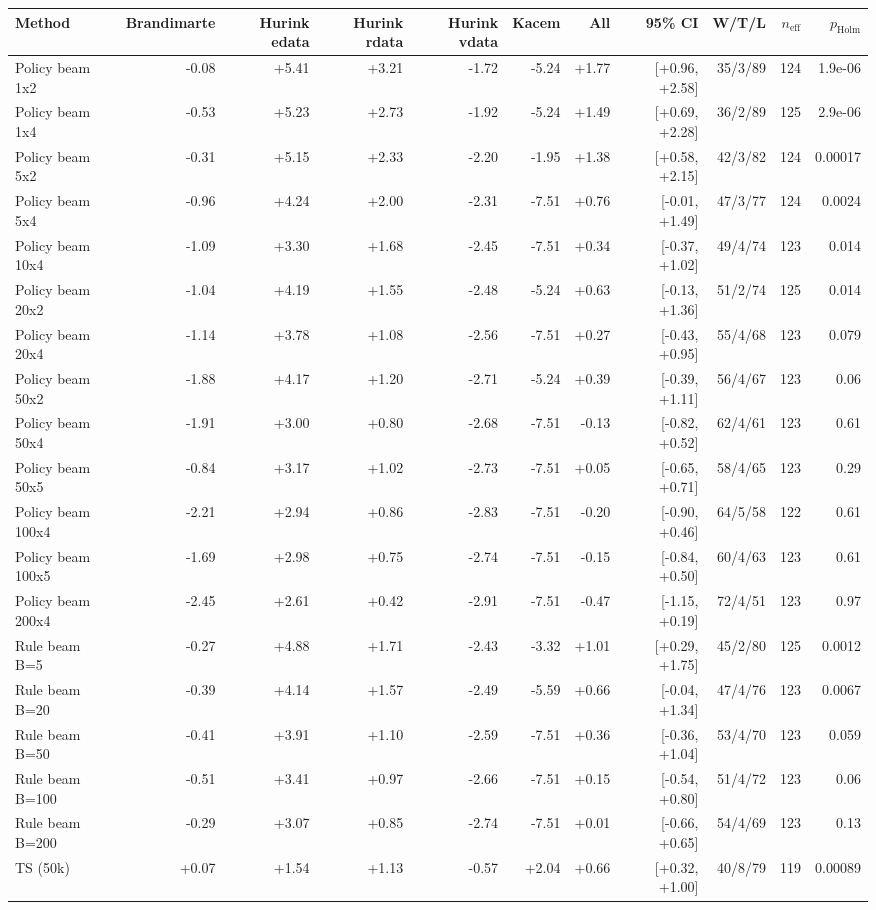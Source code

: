 \begin{tabular}{lrrrrrrrrrr}
\toprule
Method & Brandimarte & Hurink edata & Hurink rdata & Hurink vdata & Kacem & All & 95\% CI & W/T/L & $n_{\mathrm{eff}}$ & $p_{\mathrm{Holm}}$ \\
\midrule
Policy beam 1x2 & -0.08 & +5.41 & +3.21 & -1.72 & -5.24 & +1.77 & [+0.96, +2.58] & 35/3/89 & 124 & 1.9e-06 \\
Policy beam 1x4 & -0.53 & +5.23 & +2.73 & -1.92 & -5.24 & +1.49 & [+0.69, +2.28] & 36/2/89 & 125 & 2.9e-06 \\
Policy beam 5x2 & -0.31 & +5.15 & +2.33 & -2.20 & -1.95 & +1.38 & [+0.58, +2.15] & 42/3/82 & 124 & 0.00017 \\
Policy beam 5x4 & -0.96 & +4.24 & +2.00 & -2.31 & -7.51 & +0.76 & [-0.01, +1.49] & 47/3/77 & 124 & 0.0024 \\
Policy beam 10x4 & -1.09 & +3.30 & +1.68 & -2.45 & -7.51 & +0.34 & [-0.37, +1.02] & 49/4/74 & 123 & 0.014 \\
Policy beam 20x2 & -1.04 & +4.19 & +1.55 & -2.48 & -5.24 & +0.63 & [-0.13, +1.36] & 51/2/74 & 125 & 0.014 \\
Policy beam 20x4 & -1.14 & +3.78 & +1.08 & -2.56 & -7.51 & +0.27 & [-0.43, +0.95] & 55/4/68 & 123 & 0.079 \\
Policy beam 50x2 & -1.88 & +4.17 & +1.20 & -2.71 & -5.24 & +0.39 & [-0.39, +1.11] & 56/4/67 & 123 & 0.06 \\
Policy beam 50x4 & -1.91 & +3.00 & +0.80 & -2.68 & -7.51 & -0.13 & [-0.82, +0.52] & 62/4/61 & 123 & 0.61 \\
Policy beam 50x5 & -0.84 & +3.17 & +1.02 & -2.73 & -7.51 & +0.05 & [-0.65, +0.71] & 58/4/65 & 123 & 0.29 \\
Policy beam 100x4 & -2.21 & +2.94 & +0.86 & -2.83 & -7.51 & -0.20 & [-0.90, +0.46] & 64/5/58 & 122 & 0.61 \\
Policy beam 100x5 & -1.69 & +2.98 & +0.75 & -2.74 & -7.51 & -0.15 & [-0.84, +0.50] & 60/4/63 & 123 & 0.61 \\
Policy beam 200x4 & -2.45 & +2.61 & +0.42 & -2.91 & -7.51 & -0.47 & [-1.15, +0.19] & 72/4/51 & 123 & 0.97 \\
Rule beam B=5 & -0.27 & +4.88 & +1.71 & -2.43 & -3.32 & +1.01 & [+0.29, +1.75] & 45/2/80 & 125 & 0.0012 \\
Rule beam B=20 & -0.39 & +4.14 & +1.57 & -2.49 & -5.59 & +0.66 & [-0.04, +1.34] & 47/4/76 & 123 & 0.0067 \\
Rule beam B=50 & -0.41 & +3.91 & +1.10 & -2.59 & -7.51 & +0.36 & [-0.36, +1.04] & 53/4/70 & 123 & 0.059 \\
Rule beam B=100 & -0.51 & +3.41 & +0.97 & -2.66 & -7.51 & +0.15 & [-0.54, +0.80] & 51/4/72 & 123 & 0.06 \\
Rule beam B=200 & -0.29 & +3.07 & +0.85 & -2.74 & -7.51 & +0.01 & [-0.66, +0.65] & 54/4/69 & 123 & 0.13 \\
TS (50k) & +0.07 & +1.54 & +1.13 & -0.57 & +2.04 & +0.66 & [+0.32, +1.00] & 40/8/79 & 119 & 0.00089 \\
\bottomrule
\end{tabular}
